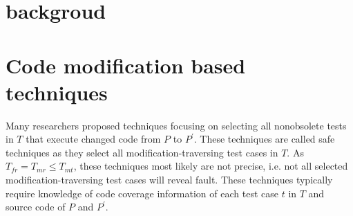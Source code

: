 
\section{backgroud}

\section{Code modification based techniques}

Many researchers proposed techniques focusing on selecting all nonobsolete tests
in $T$ that execute changed code from $P$ to $P^\prime$. These techniques are
called safe techniques as they select all modification-traversing test cases in
$T$. As $T_{fr} = T_{mr} \le T_{mt}$, these techniques most likely are not
precise, i.e. not all selected modification-traversing test cases will reveal
fault. These techniques typically require knowledge of code coverage information
of each test case $t$ in $T$ and source code of $P$ and $P^\prime$.






\newpage
